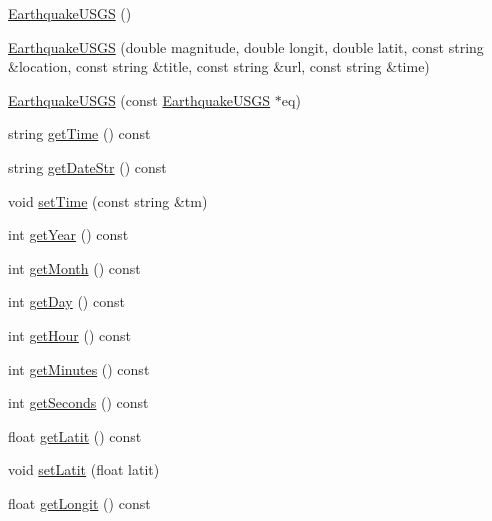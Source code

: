 \begin{DoxyCompactItemize}
\item 
\hyperlink{classbridges_1_1_earthquake_u_s_g_s_a540ae74c248da179fbbd182b843a14e0}{Earthquake\+U\+S\+G\+S} ()
\item 
\hyperlink{classbridges_1_1_earthquake_u_s_g_s_aaa8b6776e6767cf327cebbd371b2c2d0}{Earthquake\+U\+S\+G\+S} (double magnitude, double longit, double latit, const string \&location, const string \&title, const string \&url, const string \&time)
\item 
\hyperlink{classbridges_1_1_earthquake_u_s_g_s_a450f9683a698be7448ec44c06e456de0}{Earthquake\+U\+S\+G\+S} (const \hyperlink{classbridges_1_1_earthquake_u_s_g_s}{Earthquake\+U\+S\+G\+S} $\ast$eq)
\item 
string \hyperlink{classbridges_1_1_earthquake_u_s_g_s_af8230252cb495e2c87bdd0ed1fbd609f}{get\+Time} () const 
\item 
string \hyperlink{classbridges_1_1_earthquake_u_s_g_s_a74d02315dd50f0d41d0340655c700aff}{get\+Date\+Str} () const 
\item 
void \hyperlink{classbridges_1_1_earthquake_u_s_g_s_ad41157360c377050a74c0aeb76098855}{set\+Time} (const string \&tm)
\item 
int \hyperlink{classbridges_1_1_earthquake_u_s_g_s_af82196433d7fc04e309e37d902706c8d}{get\+Year} () const 
\item 
int \hyperlink{classbridges_1_1_earthquake_u_s_g_s_a9d9a998b0092f59e9b45a9c0af715813}{get\+Month} () const 
\item 
int \hyperlink{classbridges_1_1_earthquake_u_s_g_s_a469f812e467023eb9dceaa1519c8f8b8}{get\+Day} () const 
\item 
int \hyperlink{classbridges_1_1_earthquake_u_s_g_s_a2c0989152166d3ec0d3cc7feab7e9093}{get\+Hour} () const 
\item 
int \hyperlink{classbridges_1_1_earthquake_u_s_g_s_aa85673b9c3e8fdeedfd3ed9ae38507e2}{get\+Minutes} () const 
\item 
int \hyperlink{classbridges_1_1_earthquake_u_s_g_s_a73486c57f8f9e4b6cedce1907fb5ae0a}{get\+Seconds} () const 
\item 
float \hyperlink{classbridges_1_1_earthquake_u_s_g_s_a0bc39612708b8333f7c03500ccc6d614}{get\+Latit} () const 
\item 
void \hyperlink{classbridges_1_1_earthquake_u_s_g_s_a143678bb9dd697f82dcb260ddab78f82}{set\+Latit} (float latit)
\item 
float \hyperlink{classbridges_1_1_earthquake_u_s_g_s_a4387cf6d8ea0922558cb07fbd9d5b23e}{get\+Longit} () const 

\end{DoxyCompactItemize}
